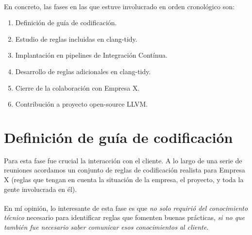 \documentclass[12pt]{extreport} %
\begin{document}
\paragraph{}
En concreto, las fases en las que estuve involucrado en orden
cronológico son:
\begin{enumerate}
\item Definición de guía de codificación.
\item Estudio de reglas incluidas en clang-tidy.
\item Implantación en pipelines de Integración Contínua.
\item Desarrollo de reglas adicionales en clang-tidy.
\item Cierre de la colaboración con Empresa X.
\item Contribución a proyecto open-source LLVM.
\end{enumerate}

\section{Definición de guía de codificación}
\label{fase-1}

Para esta fase fue crucial la interacción con el cliente. A lo largo
de una serie de reuniones acordamos un conjunto de reglas de
codificación realista para Empresa X (reglas que tengan en cuenta la
situación de la empresa, el proyecto, y toda la gente involucrada en
él).

\paragraph{}
En mí opinión, lo interesante de esta fase es que \emph{no solo
requirió del conocimiento técnico} necesario para identificar reglas
que fomenten buenas prácticas, \emph{si no que también fue necesario
saber comunicar esos conocimientos al cliente}.
\end{document}
